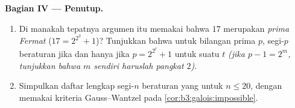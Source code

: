 \begin{problem}
\medskip
\noindent\textbf{Bagian IV --- Penutup.}
\begin{enumerate}[resume]
  \item Di manakah tepatnya argumen itu memakai bahwa $17$ merupakan
        \emph{prima Fermat} ($17 = 2^{2^2} + 1$)? Tunjukkan bahwa untuk
        bilangan prima $p$, segi-$p$ beraturan  jika dan hanya jika $p
        = 2^{2^t} + 1$ untuk suatu $t$ \emph{(jika $p - 1 = 2^m$,
        tunjukkan bahwa $m$ sendiri haruslah pangkat $2$)}.
  \item Simpulkan daftar lengkap segi-$n$ beraturan yang  untuk $n \leq 20$, dengan memakai kriteria Gauss--Wantzel
        pada \cref{cor:b3:galois:impossible}.
\end{enumerate}


\end{problem}
